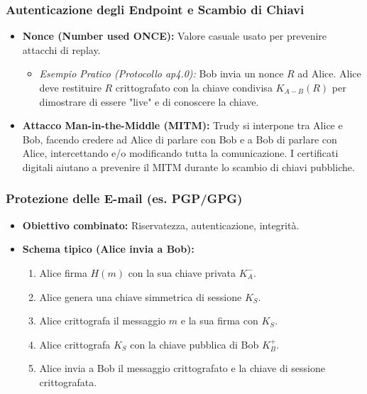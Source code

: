 \subsubsection{Autenticazione degli Endpoint e Scambio di Chiavi}
\begin{itemize}
    \item \textbf{Nonce (Number used ONCE):} Valore casuale usato per prevenire attacchi di replay.
    \begin{itemize}
        \item \emph{Esempio Pratico (Protocollo ap4.0):} Bob invia un nonce $R$ ad Alice. Alice deve restituire $R$ crittografato con la chiave condivisa $K_{A-B}(R)$ per dimostrare di essere "live" e di conoscere la chiave.
    \end{itemize}
    \item \textbf{Attacco Man-in-the-Middle (MITM):} Trudy si interpone tra Alice e Bob, facendo credere ad Alice di parlare con Bob e a Bob di parlare con Alice, intercettando e/o modificando tutta la comunicazione. I certificati digitali aiutano a prevenire il MITM durante lo scambio di chiavi pubbliche.
\end{itemize}

\subsubsection{Protezione delle E-mail (es. PGP/GPG)}
\begin{itemize}
    \item \textbf{Obiettivo combinato:} Riservatezza, autenticazione, integrità.
    \item \textbf{Schema tipico (Alice invia a Bob):}
    \begin{enumerate}
        \item Alice firma $H(m)$ con la sua chiave privata $K_A^-$.
        \item Alice genera una chiave simmetrica di sessione $K_S$.
        \item Alice crittografa il messaggio $m$ e la sua firma con $K_S$.
        \item Alice crittografa $K_S$ con la chiave pubblica di Bob $K_B^+$.
        \item Alice invia a Bob il messaggio crittografato e la chiave di sessione crittografata.
    \end{enumerate}
\end{itemize}

